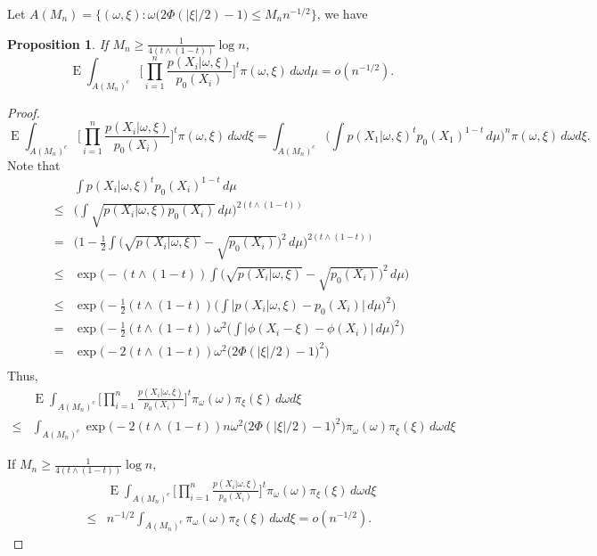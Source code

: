 \documentclass[11pt]{article}
\DeclareMathOperator{\myE}{E}
\theoremstyle{plain}
\newtheorem{proposition}{\quad\quad Proposition}
\theoremstyle{definition}
\theoremstyle{remark}
\begin{document}
\begin{appendices}
Let $A(M_n)=\{(\omega, \xi): \omega \big( 2\Phi(|\xi|/2)-1\big)\leq M_n n^{-1/2}\}$, we have
\begin{proposition}
    If $M_n \geq  \frac{1}{4(t\wedge (1-t))}\log n$,
    \begin{equation*}
        \myE \int_{A(M_n)^c} \Big[\prod_{i=1}^n \frac{p(X_i|\omega,\xi)}{p_0(X_i)}\Big]^t \pi(\omega,\xi)\, d\omega d\mu =o(n^{-1/2}).
    \end{equation*}
\end{proposition}
\begin{proof}
\begin{equation*}
    \myE \int_{A(M_n)^c} \Big[\prod_{i=1}^n \frac{p(X_i|\omega,\xi)}{p_0(X_i)}\Big]^t \pi(\omega,\xi)\, d\omega d\xi
    =
    \int_{A(M_n)^c} \big( \int p(X_1|\omega,\xi)^t p_0(X_1)^{1-t}\, d\mu\big)^n \pi(\omega,\xi)\, d\omega d\xi.
\end{equation*}
Note that
\begin{align*}
    &\int p(X_i|\omega,\xi)^t p_0(X_i)^{1-t}\, d\mu
    \\
    \leq & \Big(\int \sqrt{p(X_i|\omega,\xi) p_0(X_i)}\, d\mu\Big)^{2(t\wedge (1-t))}
    \\
= & \Big(1-\frac{1}{2}\int \big(\sqrt{p(X_i|\omega,\xi) }-\sqrt{p_0(X_i)}\big)^2\, d\mu\Big)^{2(t\wedge (1-t))}
\\
\leq & \exp \Big( -(t\wedge (1-t))\int \big(\sqrt{p(X_i|\omega,\xi) }-\sqrt{p_0(X_i)}\big)^2\, d\mu \Big)
\\
\leq & \exp \Big( -\frac{1}{2}(t\wedge (1-t)) \big(\int \big| p(X_i|\omega,\xi)-p_0(X_i)\big|\, d\mu \big)^2 \Big)
\\
= & \exp \Big( -\frac{1}{2}(t\wedge (1-t)) \omega^2 \big(\int \big| \phi(X_i -\xi)-\phi (X_i)\big|\, d\mu \big)^2 \Big)
\\
= & \exp \Big( -2(t\wedge (1-t)) \omega^2 \big( 2\Phi(|\xi|/2)-1\big)^2 \Big)
\\
\end{align*}
Thus,
\begin{align*}
    &\myE \int_{A(M_n)^c} \Big[\prod_{i=1}^n \frac{p(X_i|\omega,\xi)}{p_0(X_i)}\Big]^t \pi_{\omega}(\omega)\pi_{\xi}(\xi)\, d\omega d\xi
\\
    \leq
    &
    \int_{A(M_n)^c} \exp \Big( -2(t\wedge (1-t)) n\omega^2 \big( 2\Phi(|\xi|/2)-1\big)^2 \Big)
\pi_{\omega}(\omega) \pi_\xi(\xi)\, d\omega d\xi
\end{align*}

If $M_n \geq \frac{1}{4(t\wedge (1-t))}\log n$,
\begin{align*}
    &\myE \int_{A(M_n)^c} \Big[\prod_{i=1}^n \frac{p(X_i|\omega,\xi)}{p_0(X_i)}\Big]^t \pi_{\omega}(\omega)\pi_{\xi}(\xi)\, d\omega d\xi
\\
    \leq
    &
    n^{-1/2}
    \int_{A(M_n)^c} 
\pi_{\omega}(\omega) \pi_\xi(\xi)\, d\omega d\xi
=o(n^{-1/2}).
\end{align*}





\end{proof}
\end{appendices}
\end{document}
